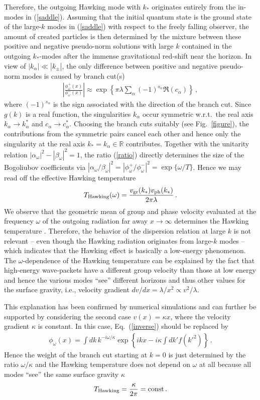\documentclass[aps,prl,showpacs,amssymb,nofootinbib,twocolumn]{revtex4}
\newcommand{\bea}{\begin{eqnarray}}
\newcommand{\ea}{\end{eqnarray}}
\begin{document}
Therefore, the outgoing Hawking mode with $k_*$ originates entirely
from the in-modes in (\ref{saddle}).  
%
Assuming that the initial quantum state is the ground state of the 
large-$k$ modes in (\ref{saddle}) with respect to the freely falling
observer, the amount of created particles is then determined by the
mixture between these positive and negative pseudo-norm solutions with
large $k$ contained in the outgoing $k_*$-modes after the immense
gravitational red-shift near the horizon.  
%
In view of $|k_\alpha|\ll|k_\pm|$, the only difference between
positive and negative pseudo-norm modes is caused by branch 
cut(s) 
%
\bea
\label{ratio}
\left|\frac{\phi_\omega^+(x)}{\phi_\omega^-(x)}\right|\approx
\exp\left\{\pi\lambda\sum\limits_\alpha (-1)^{s_\alpha} 
\Re(c_\alpha)\right\}
\,,
\ea
%
where $(-1)^{s_\alpha}$ is the sign associated with the direction of
the branch cut.
%
Since $g(k)$ is a real function, the singularities $k_\alpha$ occur 
symmetric w.r.t.\ the real axis $k_\alpha\to k_\alpha^*$ and 
$c_\alpha\to c_\alpha^*$. 
%
Choosing the branch cuts suitably (see Fig.~\ref{figure}), the 
contributions from the symmetric pairs cancel each other and 
hence only the singularity at the real axis 
$k_*=k_\alpha\in\mathbb R$ contributes. 
%
Together with the unitarity relation 
$|\alpha_\omega|^2-|\beta_\omega|^2=1$,
the ratio (\ref{ratio}) directly determines the size of the
Bogoliubov coefficients via 
$|\alpha_\omega/\beta_\omega|^2=|\phi_\omega^+/\phi_\omega^-|^2
=\exp\{\omega/T\}$. 
%
Hence we may read off the effective Hawking temperature  
%
\bea
\label{temperature}
T_{\rm Hawking}(\omega)
=
\frac{v_{\rm gr}(k_*)v_{\rm ph}(k_*)}{2\pi\lambda}
\,.
\ea
%
We observe that the geometric mean of group and phase velocity
\cite{mean} evaluated at the frequency $\omega$ of the outgoing
radiation far away $x\to\infty$ determines the Hawking temperature
\cite{triest}. 
%
Therefore, the behavior of the dispersion relation at large $k$ is
not relevant -- even though the Hawking radiation originates from
large-$k$ modes -- which indicates that the Hawking effect is
basically a low-energy phenomenon. 
%
The $\omega$-dependence of the Hawking temperature can be explained by
the fact that high-energy wave-packets have a different group velocity
than those at low energy and hence the various modes ``see'' different 
horizons and thus other values for the surface gravity, i.e., 
velocity gradient $dv/dx=\lambda/x^2\propto v^2/\lambda$. 

This explanation has been confirmed by numerical simulations 
\cite{triest} and can further be supported by considering the second
case $v(x)=\kappa x$, where the velocity gradient $\kappa$ is
constant. 
% 
In this case, Eq.~(\ref{inverse}) should be replaced by 
%
\bea
\phi_\omega(x)=\int dk\,k^{-i\omega/\kappa}
\exp\left\{ikx-i\kappa\int dk'f(k'^2)\right\}
\,.
\ea
%
Hence the weight of the branch cut starting at $k=0$ is just
determined by the ratio $\omega/\kappa$ and the Hawking temperature
does not depend on $\omega$ at all because all modes ``see'' the same
surface gravity $\kappa$ 
%
\bea
\label{kappa}
T_{\rm Hawking}
=
\frac{\kappa}{2\pi}
=
\rm const
\,.
\ea
%
\end{document}
